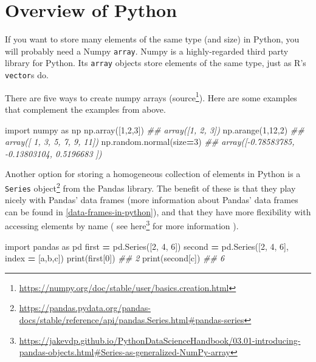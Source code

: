 \documentclass[
  12pt,
  krantz2]{krantz}
\makeatletter
\newenvironment{Shaded}{\begin{snugshade}}{\end{snugshade}}
\newcommand{\BuiltInTok}[1]{#1}
\newcommand{\CommentTok}[1]{\textcolor[rgb]{0.37,0.37,0.37}{\textit{#1}}}
\newcommand{\DecValTok}[1]{\textcolor[rgb]{0.06,0.06,0.06}{#1}}
\newcommand{\ImportTok}[1]{#1}
\newcommand{\NormalTok}[1]{#1}
\newcommand{\OperatorTok}[1]{\textcolor[rgb]{0.43,0.43,0.43}{\textbf{#1}}}
\newcommand{\StringTok}[1]{\textcolor[rgb]{0.5,0.5,0.5}{#1}}
\renewcommand{\href}[2]{#2\footnote{\url{#1}}}
\newenvironment{kframe}{%
\medskip{}
\setlength{\fboxsep}{.8em}
 \def\at@end@of@kframe{}%
 \ifinner\ifhmode%
  \def\at@end@of@kframe{\end{minipage}}%
  \begin{minipage}{\columnwidth}%
 \fi\fi%
 \def\FrameCommand##1{\hskip\@totalleftmargin \hskip-\fboxsep
 \colorbox{shadecolor}{##1}\hskip-\fboxsep
     \hskip-\linewidth \hskip-\@totalleftmargin \hskip\columnwidth}%
 \MakeFramed {\advance\hsize-\width
   \@totalleftmargin\z@ \linewidth\hsize
   \@setminipage}}%
 {\par\unskip\endMakeFramed%
 \at@end@of@kframe}
\renewenvironment{Shaded}{\begin{kframe}}{\end{kframe}}
\makeatother
\begin{document}
\hypertarget{overview-of-python}{%
\section{Overview of Python}\label{overview-of-python}}

If you want to store many elements of the same type (and size) in Python, you will probably need a Numpy \texttt{array}. Numpy is a highly-regarded third party library \citep{harris2020array} for Python. Its \texttt{array} objects store elements of the same type, just as R's \texttt{vector}s do.

There are five ways to create numpy arrays (\href{https://numpy.org/doc/stable/user/basics.creation.html}{source}). Here are some examples that complement the examples from above.

\begin{Shaded}
\begin{Highlighting}[]
\ImportTok{import}\NormalTok{ numpy }\ImportTok{as}\NormalTok{ np   }
\NormalTok{np.array([}\DecValTok{1}\NormalTok{,}\DecValTok{2}\NormalTok{,}\DecValTok{3}\NormalTok{])}
\CommentTok{\#\# array([1, 2, 3])}
\NormalTok{np.arange(}\DecValTok{1}\NormalTok{,}\DecValTok{12}\NormalTok{,}\DecValTok{2}\NormalTok{)}
\CommentTok{\#\# array([ 1,  3,  5,  7,  9, 11])}
\NormalTok{np.random.normal(size}\OperatorTok{=}\DecValTok{3}\NormalTok{)}
\CommentTok{\#\# array([{-}0.78583785, {-}0.13803104,  0.5196683 ])}
\end{Highlighting}
\end{Shaded}

Another option for storing a homogeneous collection of elements in Python is a \href{https://pandas.pydata.org/pandas-docs/stable/reference/api/pandas.Series.html\#pandas-series}{\texttt{Series} object} from the Pandas library. The benefit of these is that they play nicely with Pandas' data frames (more information about Pandas' data frames can be found in \ref{data-frames-in-python}), and that they have more flexibility with accessing elements by name ( see \href{https://jakevdp.github.io/PythonDataScienceHandbook/03.01-introducing-pandas-objects.html\#Series-as-generalized-NumPy-array}{here} for more information ).

\begin{Shaded}
\begin{Highlighting}[]
\ImportTok{import}\NormalTok{ pandas }\ImportTok{as}\NormalTok{ pd}
\NormalTok{first }\OperatorTok{=}\NormalTok{ pd.Series([}\DecValTok{2}\NormalTok{, }\DecValTok{4}\NormalTok{, }\DecValTok{6}\NormalTok{])}
\NormalTok{second }\OperatorTok{=}\NormalTok{ pd.Series([}\DecValTok{2}\NormalTok{, }\DecValTok{4}\NormalTok{, }\DecValTok{6}\NormalTok{], index }\OperatorTok{=}\NormalTok{ [}\StringTok{\textquotesingle{}a\textquotesingle{}}\NormalTok{,}\StringTok{\textquotesingle{}b\textquotesingle{}}\NormalTok{,}\StringTok{\textquotesingle{}c\textquotesingle{}}\NormalTok{])}
\BuiltInTok{print}\NormalTok{(first[}\DecValTok{0}\NormalTok{])}
\CommentTok{\#\# 2}
\BuiltInTok{print}\NormalTok{(second[}\StringTok{\textquotesingle{}c\textquotesingle{}}\NormalTok{])}
\CommentTok{\#\# 6}
\end{Highlighting}
\end{Shaded}
\end{document}
